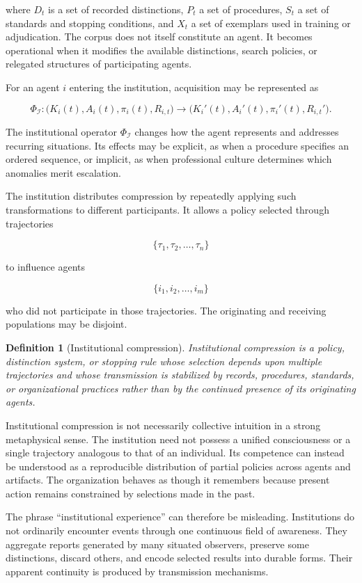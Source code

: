 \documentclass[11pt]{article}
\newtheorem{definition}[proposition]{Definition}
\begin{document}
where $D_t$ is a set of recorded distinctions, $P_t$ a set of procedures, $S_t$ a set of standards and stopping conditions, and $X_t$ a set of exemplars used in training or adjudication. The corpus does not itself constitute an agent. It becomes operational when it modifies the available distinctions, search policies, or relegated structures of participating agents.

For an agent $i$ entering the institution, acquisition may be represented as

\[
\Phi_{\mathcal{I}} :
\bigl(
K_i(t),A_i(t),\pi_i(t),R_{i,t}
\bigr)
\longrightarrow
\bigl(
K_i'(t),A_i'(t),\pi_i'(t),R_{i,t}'
\bigr).
\]

The institutional operator $\Phi_{\mathcal{I}}$ changes how the agent represents and addresses recurring situations. Its effects may be explicit, as when a procedure specifies an ordered sequence, or implicit, as when professional culture determines which anomalies merit escalation.

The institution distributes compression by repeatedly applying such transformations to different participants. It allows a policy selected through trajectories

\[
\{\tau_1,\tau_2,\ldots,\tau_n\}
\]

to influence agents

\[
\{i_1,i_2,\ldots,i_m\}
\]

who did not participate in those trajectories. The originating and receiving populations may be disjoint.

\begin{definition}[Institutional compression]
Institutional compression is a policy, distinction system, or stopping rule whose selection depends upon multiple trajectories and whose transmission is stabilized by records, procedures, standards, or organizational practices rather than by the continued presence of its originating agents.
\end{definition}

Institutional compression is not necessarily collective intuition in a strong metaphysical sense. The institution need not possess a unified consciousness or a single trajectory analogous to that of an individual. Its competence can instead be understood as a reproducible distribution of partial policies across agents and artifacts. The organization behaves as though it remembers because present action remains constrained by selections made in the past.

The phrase ``institutional experience'' can therefore be misleading. Institutions do not ordinarily encounter events through one continuous field of awareness. They aggregate reports generated by many situated observers, preserve some distinctions, discard others, and encode selected results into durable forms. Their apparent continuity is produced by transmission mechanisms.
\end{document}
